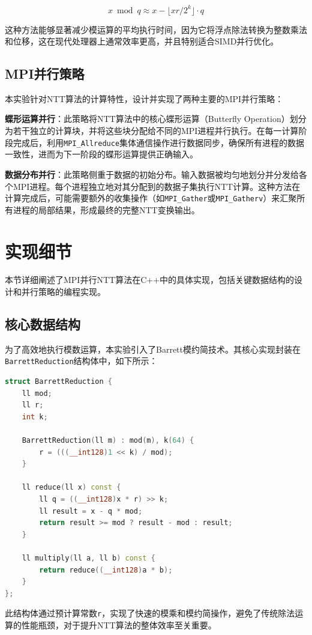 \documentclass[a4paper]{article}
\begin{document}
$$x \bmod q \approx x - \lfloor xr/2^k \rfloor \cdot q$$

这种方法能够显著减少模运算的平均执行时间，因为它将浮点除法转换为整数乘法和位移，这在现代处理器上通常效率更高，并且特别适合SIMD并行优化。

\subsection{MPI并行策略}

本实验针对NTT算法的计算特性，设计并实现了两种主要的MPI并行策略：

\textbf{蝶形运算并行}：此策略将NTT算法中的核心蝶形运算（Butterfly Operation）划分为若干独立的计算块，并将这些块分配给不同的MPI进程并行执行。在每一计算阶段完成后，利用\texttt{MPI\_Allreduce}集体通信操作进行数据同步，确保所有进程的数据一致性，进而为下一阶段的蝶形运算提供正确输入。

\textbf{数据分布并行}：此策略侧重于数据的初始分布。输入数据被均匀地划分并分发给各个MPI进程。每个进程独立地对其分配到的数据子集执行NTT计算。这种方法在计算完成后，可能需要额外的收集操作（如\texttt{MPI\_Gather}或\texttt{MPI\_Gatherv}）来汇聚所有进程的局部结果，形成最终的完整NTT变换输出。

\section{实现细节}

本节详细阐述了MPI并行NTT算法在C++中的具体实现，包括关键数据结构的设计和并行策略的编程实现。

\subsection{核心数据结构}

为了高效地执行模数运算，本实验引入了Barrett模约简技术。其核心实现封装在\texttt{BarrettReduction}结构体中，如下所示：

\begin{lstlisting}[title=Barrett规约结构,frame=trbl,language={C++}]
struct BarrettReduction {
    ll mod;
    ll r;
    int k;
    
    BarrettReduction(ll m) : mod(m), k(64) {
        r = (((__int128)1 << k) / mod);
    }
    
    ll reduce(ll x) const {
        ll q = ((__int128)x * r) >> k;
        ll result = x - q * mod;
        return result >= mod ? result - mod : result;
    }
    
    ll multiply(ll a, ll b) const {
        return reduce((__int128)a * b);
    }
};
\end{lstlisting}
此结构体通过预计算常数\texttt{r}，实现了快速的模乘和模约简操作，避免了传统除法运算的性能瓶颈，对于提升NTT算法的整体效率至关重要。
\end{document}
